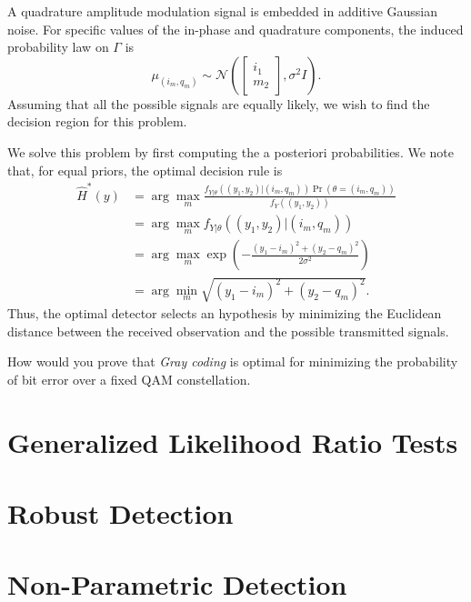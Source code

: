 \begin{example}
A quadrature amplitude modulation signal is embedded in additive Gaussian noise.
For specific values of the in-phase and quadrature components, the induced probability law on $\Gamma$ is
\begin{equation*}
\mu_{(i_m, q_m)} \sim \mathcal{N} \left( \left[ \begin{array}{c} i_1 \\ m_2 \end{array} \right], \sigma^2 I \right) .
\end{equation*}
Assuming that all the possible signals are equally likely, we wish to find the decision region for this problem.

We solve this problem by first computing the a posteriori probabilities.
We note that, for equal priors, the optimal decision rule is
\begin{equation*}
\begin{split}
\hat{H}^*(y)
&= \arg \max_{m} \frac{ f_{Y|\theta} ((y_1, y_2) | (i_m, q_m))
\Pr (\theta = (i_m, q_m)) }{ f_{Y} ((y_1, y_2)) } \\
&= \arg \max_{m} f_{Y|\theta} ((y_1, y_2) | (i_m, q_m)) \\
&= \arg \max_{m} \exp \left( - \frac{(y_1 - i_m)^2 + (y_2 - q_m)^2}{2 \sigma^2} \right) \\
&= \arg \min_{m} \sqrt{(y_1 - i_m)^2 + (y_2 - q_m)^2} .
\end{split}
\end{equation*}
Thus, the optimal detector selects an hypothesis by minimizing the Euclidean distance between the received observation and the possible transmitted signals.
\end{example}

How would you prove that \emph{Gray coding} is optimal for minimizing the probability of bit error over a fixed QAM constellation.

\newpage

\section{Generalized Likelihood Ratio Tests}
\section{Robust Detection}
\section{Non-Parametric Detection}
